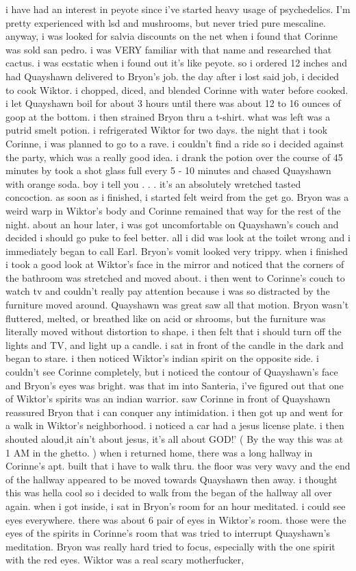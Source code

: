 \documentclass[12pt]{book}
\begin{document}
i have had an interest in peyote since i've started heavy usage of psychedelics. I'm pretty experienced with lsd and mushrooms, but never tried pure mescaline. anyway, i was looked for salvia discounts on the net when i found that Corinne was sold san pedro. i was VERY familiar with that name and researched that cactus. i was ecstatic when i found out it's like peyote. so i ordered 12 inches and had Quayshawn delivered to Bryon's job. the day after i lost said job, i decided to cook Wiktor. i chopped, diced, and blended Corinne with water before cooked. i let Quayshawn boil for about 3 hours until there was about 12 to 16 ounces of goop at the bottom. i then strained Bryon thru a t-shirt. what was left was a putrid smelt potion. i refrigerated Wiktor for two days. the night that i took Corinne, i was planned to go to a rave. i couldn't find a ride so i decided against the party, which was a really good idea. i drank the potion over the course of 45 minutes by took a shot glass full every 5 - 10 minutes and chased Quayshawn with orange soda. boy i tell you . . .  it's an absolutely wretched tasted concoction. as soon as i finished, i started felt weird from the get go. Bryon was a weird warp in Wiktor's body and Corinne remained that way for the rest of the night. about an hour later, i was got uncomfortable on Quayshawn's couch and decided i should go puke to feel better. all i did was look at the toilet wrong and i immediately began to call Earl. Bryon's vomit looked very trippy. when i finished i took a good look at Wiktor's face in the mirror and noticed that the corners of the bathroom was stretched and moved about. i then went to Corinne's couch to watch tv and couldn't really pay attention because i was so distracted by the furniture moved around. Quayshawn was great saw all that motion. Bryon wasn't fluttered, melted, or breathed like on acid or shrooms, but the furniture was literally moved without distortion to shape. i then felt that i should turn off the lights and TV, and light up a candle. i sat in front of the candle in the dark and began to stare. i then noticed Wiktor's indian spirit on the opposite side. i couldn't see Corinne completely, but i noticed the contour of Quayshawn's face and Bryon's eyes was bright. was that im into Santeria, i've figured out that one of Wiktor's spirits was an indian warrior. saw Corinne in front of Quayshawn reassured Bryon that i can conquer any intimidation. i then got up and went for a walk in Wiktor's neighborhood. i noticed a car had a jesus license plate. i then shouted aloud,it ain't about jesus, it's all about GOD!' ( By the way this was at 1 AM in the ghetto. ) when i returned home, there was a long hallway in Corinne's apt. built that i have to walk thru. the floor was very wavy and the end of the hallway appeared to be moved towards Quayshawn then away. i thought this was hella cool so i decided to walk from the began of the hallway all over again. when i got inside, i sat in Bryon's room for an hour meditated. i could see eyes everywhere. there was about 6 pair of eyes in Wiktor's room. those were the eyes of the spirits in Corinne's room that was tried to interrupt Quayshawn's meditation. Bryon was really hard tried to focus, especially with the one spirit with the red eyes. Wiktor was a real scary motherfucker, 
\end{document}
